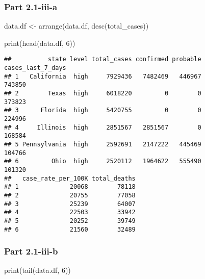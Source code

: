 \documentclass[
]{article}
\newenvironment{Shaded}{\begin{snugshade}}{\end{snugshade}}
\newcommand{\DecValTok}[1]{\textcolor[rgb]{0.00,0.00,0.81}{#1}}
\newcommand{\FunctionTok}[1]{\textcolor[rgb]{0.00,0.00,0.00}{#1}}
\newcommand{\NormalTok}[1]{#1}
\newcommand{\OtherTok}[1]{\textcolor[rgb]{0.56,0.35,0.01}{#1}}
\begin{document}
\hypertarget{part-2.1-iii-a}{%
\subsubsection{Part 2.1-iii-a}\label{part-2.1-iii-a}}

\begin{Shaded}
\begin{Highlighting}[]
\NormalTok{data.df }\OtherTok{\textless{}{-}} \FunctionTok{arrange}\NormalTok{(data.df, }\FunctionTok{desc}\NormalTok{(total\_cases))}

\FunctionTok{print}\NormalTok{(}\FunctionTok{head}\NormalTok{(data.df, }\DecValTok{6}\NormalTok{))}
\end{Highlighting}
\end{Shaded}

\begin{verbatim}
##          state level total_cases confirmed probable cases_last_7_days
## 1   California  high     7929436   7482469   446967            743850
## 2        Texas  high     6018220         0        0            373823
## 3      Florida  high     5420755         0        0            224996
## 4     Illinois  high     2851567   2851567        0            168584
## 5 Pennsylvania  high     2592691   2147222   445469            104766
## 6         Ohio  high     2520112   1964622   555490            101320
##   case_rate_per_100K total_deaths
## 1              20068        78118
## 2              20755        77058
## 3              25239        64007
## 4              22503        33942
## 5              20252        39749
## 6              21560        32489
\end{verbatim}

\hypertarget{part-2.1-iii-b}{%
\subsubsection{Part 2.1-iii-b}\label{part-2.1-iii-b}}

\begin{Shaded}
\begin{Highlighting}[]
\FunctionTok{print}\NormalTok{(}\FunctionTok{tail}\NormalTok{(data.df, }\DecValTok{6}\NormalTok{))}
\end{Highlighting}
\end{Shaded}
\end{document}
